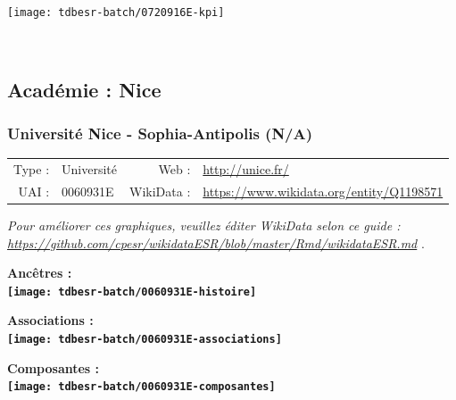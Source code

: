 \documentclass[12pt,french,]{article}
\begin{document}
\begin{center}\texttt{[image: tdbesr-batch/0720916E-kpi]} \end{center}\checkoddpage

\ifoddpage \fi ~\newpage  

\hypertarget{acaduxe9mie-nice}{%
\subsection{Académie : Nice}\label{acaduxe9mie-nice}}

\hypertarget{universituxe9-nice---sophia-antipolis-na}{%
\subsubsection{Université Nice - Sophia-Antipolis
(N/A)}\label{universituxe9-nice---sophia-antipolis-na}}

\begin{tabular*}{\textwidth}{rp{5cm}rl}  
\hline  
Type : & Université & Web : &\href{http://unice.fr/}{http://unice.fr/} \\  
UAI : & 0060931E & WikiData : & \href{https://www.wikidata.org/entity/Q1198571}{https://www.wikidata.org/entity/Q1198571} \\  
\hline  
\end{tabular*}

\textit{\scriptsize Pour améliorer ces graphiques, veuillez éditer WikiData selon ce guide :  \href{https://github.com/cpesr/wikidataESR/blob/master/Rmd/wikidataESR.md}{https://github.com/cpesr/wikidataESR/blob/master/Rmd/wikidataESR.md}}
.

\vspace{1cm}  
\begin{minipage}[b]{0.50\textwidth}\begin{center} \bf Ancêtres : \\  
\texttt{[image: tdbesr-batch/0060931E-histoire]} \end{center}\end{minipage}\begin{minipage}[b]{0.50\textwidth}\begin{center} \bf Associations : \\  
\texttt{[image: tdbesr-batch/0060931E-associations]} \end{center}\end{minipage}

\hrulefill

\begin{center} \bf Composantes : \\  
\texttt{[image: tdbesr-batch/0060931E-composantes]} \end{center}
\end{document}
